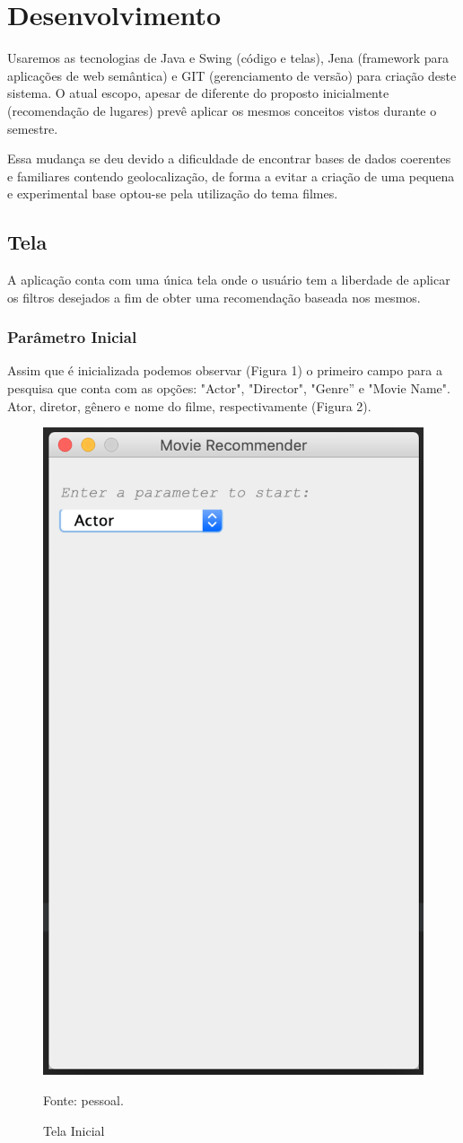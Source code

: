 \chapter{Desenvolvimento}\label{cap_intro}

 Usaremos as tecnologias de Java e Swing (código e telas), Jena (framework para aplicações de web semântica) e GIT (gerenciamento de versão) para criação deste sistema. O atual escopo, apesar de diferente do proposto inicialmente (recomendação de lugares) prevê aplicar os mesmos conceitos vistos durante o semestre.

Essa mudança se deu devido a dificuldade de encontrar bases de dados coerentes e familiares contendo geolocalização, de forma a evitar a criação de uma pequena e experimental base optou-se pela utilização do tema filmes.

\section{Tela}

 A aplicação conta com uma única tela onde o usuário tem a liberdade de aplicar os filtros desejados a fim de obter uma recomendação baseada nos mesmos.
 
 \subsection{Parâmetro Inicial} 
 
 Assim que é inicializada podemos observar (Figura 1) o primeiro campo para a pesquisa que conta com as opções: "Actor", "Director", "Genre'' e "Movie Name". Ator, diretor, gênero e nome do filme, respectivamente (Figura 2).
 
 \begin{figure}[H]
 	\centering
 	\includegraphics[width=0.5\linewidth]{images/telaInicial1}
 	\caption{Tela Inicial}
 	Fonte: pessoal.
 	\label{fig:Tela Inicial}
 \end{figure}
 
